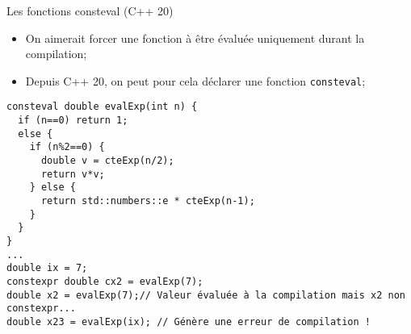 \documentclass[compress,10pt,aspectratio=169]{beamer}
\begin{document}
\begin{frame}[fragile]{Les fonctions consteval (C++ 20)}
  \scriptsize

  \begin{itemize}
\item On aimerait forcer une fonction à être évaluée uniquement durant la compilation;
\item Depuis C++ 20, on peut pour cela déclarer une fonction \texttt{consteval};
  \end{itemize}

\begin{verbatim}
consteval double evalExp(int n) {
  if (n==0) return 1;
  else {
    if (n%2==0) {
      double v = cteExp(n/2);
      return v*v;
    } else {
      return std::numbers::e * cteExp(n-1);
    }
  }
}
... 
double ix = 7;
constexpr double cx2 = evalExp(7);
double x2 = evalExp(7);// Valeur évaluée à la compilation mais x2 non constexpr...
double x23 = evalExp(ix); // Génère une erreur de compilation !

\end{verbatim}
\end{frame}
\end{document}
